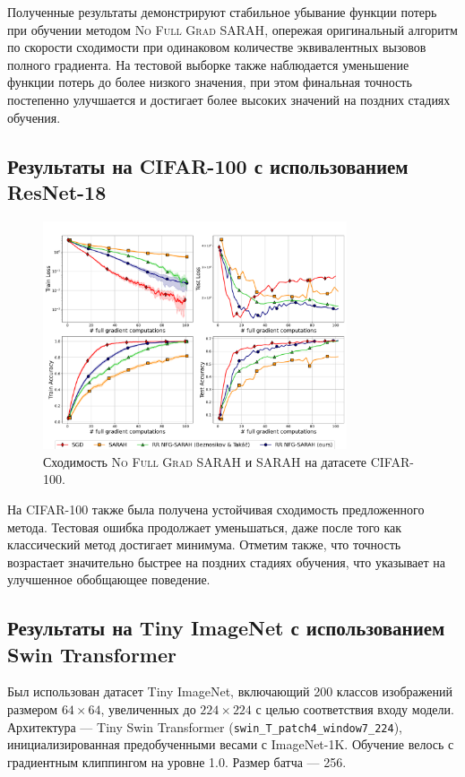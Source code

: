 Полученные результаты демонстрируют стабильное убывание функции потерь при обучении методом \textsc{No Full Grad SARAH}, опережая оригинальный алгоритм по скорости сходимости при одинаковом количестве эквивалентных вызовов полного градиента. На тестовой выборке также наблюдается уменьшение функции потерь до более низкого значения, при этом финальная точность постепенно улучшается и достигает более высоких значений на поздних стадиях обучения.

\subsection{Результаты на \textsc{CIFAR-100} с использованием ResNet-18}
\begin{figure}[H]
\centering
\includegraphics[width=0.8\textwidth]{plots/CIFAR100_LR=0.7_plots_compressed.pdf}
\caption{Сходимость \textsc{No Full Grad SARAH} и \textsc{SARAH} на датасете CIFAR-100.}
\label{fig:sarah_100}
\end{figure}

На CIFAR-100 также была получена устойчивая сходимость предложенного метода. Тестовая ошибка продолжает уменьшаться, даже после того как классический метод достигает минимума. Отметим также, что точность возрастает значительно быстрее на поздних стадиях обучения, что указывает на улучшенное обобщающее поведение.

\subsection{Результаты на Tiny ImageNet с использованием Swin Transformer}

Был использован датасет Tiny ImageNet, включающий 200 классов изображений размером $64\times64$, увеличенных до $224\times224$ с целью соответствия входу модели. Архитектура — Tiny Swin Transformer (\texttt{swin\_T\_patch4\_window7\_224}), инициализированная предобученными весами с ImageNet-1K. Обучение велось с градиентным клиппингом на уровне 1.0. Размер батча — 256.

